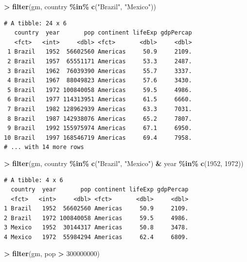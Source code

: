 \documentclass[
]{krantz}
\makeatletter
\newenvironment{Shaded}{\begin{snugshade}}{\end{snugshade}}
\newcommand{\DecValTok}[1]{\textcolor[rgb]{0.06,0.06,0.06}{#1}}
\newcommand{\KeywordTok}[1]{\textcolor[rgb]{0.27,0.27,0.27}{\textbf{#1}}}
\newcommand{\NormalTok}[1]{#1}
\newcommand{\OperatorTok}[1]{\textcolor[rgb]{0.43,0.43,0.43}{\textbf{#1}}}
\newcommand{\StringTok}[1]{\textcolor[rgb]{0.5,0.5,0.5}{#1}}
\newenvironment{kframe}{%
\medskip{}
\setlength{\fboxsep}{.8em}
 \def\at@end@of@kframe{}%
 \ifinner\ifhmode%
  \def\at@end@of@kframe{\end{minipage}}%
  \begin{minipage}{\columnwidth}%
 \fi\fi%
 \def\FrameCommand##1{\hskip\@totalleftmargin \hskip-\fboxsep
 \colorbox{shadecolor}{##1}\hskip-\fboxsep
     \hskip-\linewidth \hskip-\@totalleftmargin \hskip\columnwidth}%
 \MakeFramed {\advance\hsize-\width
   \@totalleftmargin\z@ \linewidth\hsize
   \@setminipage}}%
 {\par\unskip\endMakeFramed%
 \at@end@of@kframe}
\renewenvironment{Shaded}{\begin{kframe}}{\end{kframe}}
\makeatother
\begin{document}
\begin{Shaded}
\begin{Highlighting}[]
\OperatorTok{\textgreater{}}\StringTok{ }\KeywordTok{filter}\NormalTok{(gm, country }\OperatorTok{\%in\%}\StringTok{ }\KeywordTok{c}\NormalTok{(}\StringTok{"Brazil"}\NormalTok{, }\StringTok{"Mexico"}\NormalTok{))}
\end{Highlighting}
\end{Shaded}

\begin{verbatim}
# A tibble: 24 x 6
   country  year       pop continent lifeExp gdpPercap
   <fct>   <int>     <dbl> <fct>       <dbl>     <dbl>
 1 Brazil   1952  56602560 Americas     50.9     2109.
 2 Brazil   1957  65551171 Americas     53.3     2487.
 3 Brazil   1962  76039390 Americas     55.7     3337.
 4 Brazil   1967  88049823 Americas     57.6     3430.
 5 Brazil   1972 100840058 Americas     59.5     4986.
 6 Brazil   1977 114313951 Americas     61.5     6660.
 7 Brazil   1982 128962939 Americas     63.3     7031.
 8 Brazil   1987 142938076 Americas     65.2     7807.
 9 Brazil   1992 155975974 Americas     67.1     6950.
10 Brazil   1997 168546719 Americas     69.4     7958.
# ... with 14 more rows
\end{verbatim}

\begin{Shaded}
\begin{Highlighting}[]
\OperatorTok{\textgreater{}}\StringTok{ }\KeywordTok{filter}\NormalTok{(gm, country }\OperatorTok{\%in\%}\StringTok{ }\KeywordTok{c}\NormalTok{(}\StringTok{"Brazil"}\NormalTok{, }\StringTok{"Mexico"}\NormalTok{) }\OperatorTok{\&}\StringTok{ }\NormalTok{year }\OperatorTok{\%in\%}\StringTok{ }\KeywordTok{c}\NormalTok{(}\DecValTok{1952}\NormalTok{, }\DecValTok{1972}\NormalTok{))}
\end{Highlighting}
\end{Shaded}

\begin{verbatim}
# A tibble: 4 x 6
  country  year       pop continent lifeExp gdpPercap
  <fct>   <int>     <dbl> <fct>       <dbl>     <dbl>
1 Brazil   1952  56602560 Americas     50.9     2109.
2 Brazil   1972 100840058 Americas     59.5     4986.
3 Mexico   1952  30144317 Americas     50.8     3478.
4 Mexico   1972  55984294 Americas     62.4     6809.
\end{verbatim}

\begin{Shaded}
\begin{Highlighting}[]
\OperatorTok{\textgreater{}}\StringTok{ }\KeywordTok{filter}\NormalTok{(gm, pop }\OperatorTok{\textgreater{}}\StringTok{ }\DecValTok{300000000}\NormalTok{)}
\end{Highlighting}
\end{Shaded}
\end{document}
